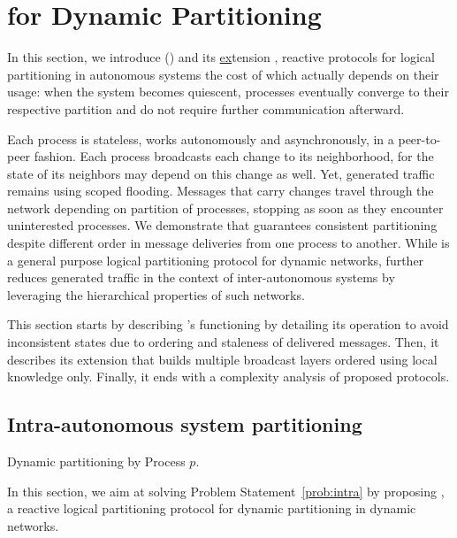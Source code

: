 
\section{\NAME for Dynamic Partitioning}
\label{sec:proposal}

In this section, we introduce \NAME () and its
\underline{ex}tension \NAMEB, reactive protocols for logical
partitioning in autonomous systems the cost of which actually depends
on their usage: when the system becomes quiescent, processes
eventually converge to their respective partition and do not require
further communication afterward.

Each process is stateless, works autonomously and asynchronously, in a
peer-to-peer fashion. Each process broadcasts each change to its
neighborhood, for the state of its neighbors may depend on this change
as well. Yet, generated traffic remains  using scoped
flooding. Messages that carry changes travel through the network
depending on partition of processes, stopping as soon as they
encounter uninterested processes. We demonstrate that \NAME guarantees
consistent partitioning despite different order in message deliveries
from one process to another. While \NAME is a general purpose logical
partitioning protocol for dynamic networks, \NAMEB further reduces
generated traffic in the context of inter-autonomous systems by
leveraging the hierarchical properties of such networks. 

This section starts by describing \NAME's functioning by detailing its
operation to avoid inconsistent states due to ordering and staleness
of delivered messages. Then, it describes its extension \NAMEB that
builds multiple broadcast layers ordered using local knowledge only.
Finally, it ends with a complexity analysis of proposed protocols. 



\subsection{Intra-autonomous system partitioning}

\begin{algorithm}
  
  \caption{\label{algo:adddelundo}Dynamic partitioning by Process $p$.}
\end{algorithm}



In this section, we aim at solving Problem Statement~\ref{prob:intra}
by proposing \NAME, a reactive logical partitioning protocol for
dynamic partitioning in dynamic networks.


